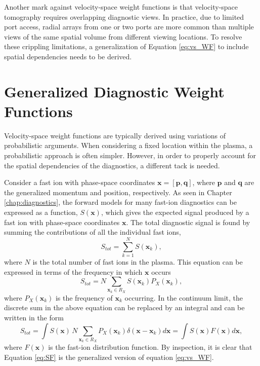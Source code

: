 Another mark against velocity-space weight functions is that velocity-space tomography requires overlapping diagnostic views.
In practice, due to limited port access, radial arrays from one or two ports are more common than multiple views of the same spatial volume from different viewing locations. 
To resolve these crippling limitations, a generalization of Equation \ref{eq:vs_WF} to include spatial dependencies needs to be derived.

\section{Generalized Diagnostic Weight Functions} \label{sec:generalized_weight}
Velocity-space weight functions are typically derived using variations of probabilistic arguments\cite{salewski2011,salewski2014,jacobsen2015,salewski2015,salewski2015}. When considering a fixed location within the plasma, a probabilistic approach is often simpler. However, in order to properly account for the spatial dependencies of the diagnostics, a different tack is needed.

Consider a fast ion with phase-space coordinates $\mathbf{x} = [\mathbf{p},\mathbf{q}]$, where $\mathbf{p}$ and $\mathbf{q}$ are the generalized momentum and position, respectively.
As seen in Chapter \ref{chap:diagnostics}, the forward models for many fast-ion diagnostics can be expressed as a function, $S(\mathbf{x})$, which gives the expected signal produced by a fast ion with phase-space coordinates $\mathbf{x}$.
The total diagnostic signal is found by summing the contributions of all the individual fast ions,
\begin{equation}\label{eq:sum_S}
    S_{tot} = \sum_{k=1}^N S(\mathbf{x}_k),
\end{equation}
where $N$ is the total number of fast ions in the plasma.
This equation can be expressed in terms of the frequency in which $\mathbf{x}$ occurs
\begin{equation}\label{eq:sum_SP}
    S_{tot} = N \sum_{\mathbf{x}_k \in R_{X}} S(\mathbf{x}_k) P_X(\mathbf{x}_k),
\end{equation}
where $P_X(\mathbf{x}_k)$ is the frequency of $\mathbf{x}_k$ occurring.
In the continuum limit, the discrete sum in the above equation can be replaced by an integral and can be written in the form
\begin{equation}\label{eq:SF}
    S_{tot} = \int S(\mathbf{x})\,N \sum_{\mathbf{x}_k \in R_{X}} P_X(\mathbf{x}_k) \delta(\mathbf{x} - \mathbf{x}_k) d\mathbf{x} = \int S(\mathbf{x}) F(\mathbf{x}) d\mathbf{x},
\end{equation}
where $F(\mathbf{x})$ is the fast-ion distribution function.
By inspection, it is clear that Equation \ref{eq:SF} is the generalized version of equation \ref{eq:vs_WF}.

